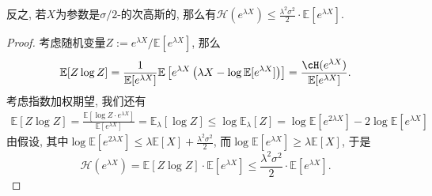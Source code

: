 \begin{remark}
	反之, 若$X$为参数是$\sigma/2$-的次高斯的, 那么有$\mathcal{H}(e^{\lambda X}) \leq \frac{\lambda^2 \sigma^2}{2} \cdot \mathbb{E}[e^{\lambda X}]$. 
	\begin{proof}
		考虑随机变量$Z := e^{\lambda X} / \mathbb{E}[e^{\lambda X}]$, 那么
		\begin{equation*}
			\mathbb{E}[Z \log Z] 
			= \frac{1}{\mathbb{E}[e^{\lambda X}]} \mathbb{E} \left[ e^{\lambda X} \left(\lambda X - \log \mathbb{E}[e^{\lambda X}] \right) \right]
			= \frac{\cH(e^{\lambda X})}{\mathbb{E}[e^{\lambda X}]}. 
		\end{equation*}
		考虑指数加权期望, 我们还有
		\begin{align*}
			\mathbb{E}[Z \log Z]
			= \frac{\mathbb{E}[\log Z \cdot e^{\lambda X}]}{\mathbb{E}[e^{\lambda X}]}
			= \mathbb{E}_{\lambda}[\log Z]
			\leq \log \mathbb{E}_{\lambda} [Z]
			= \log \mathbb{E}[e^{2\lambda X}] - 2 \log \mathbb{E}[e^{\lambda X}]
		\end{align*}
		由假设, 其中$\log \mathbb{E}[e^{2\lambda X}] \leq \lambda \mathbb{E}[X] + \frac{\lambda^2 \sigma^2}{2}$, 而$\log \mathbb{E}[e^{\lambda X}] \geq \lambda \mathbb{E}[X]$, 于是
		\begin{equation*}
			\mathcal{H}(e^{\lambda X})
			= \mathbb{E}[Z \log Z] \cdot \mathbb{E}[e^{\lambda X}]
			\leq \frac{\lambda^2 \sigma^2}{2} \cdot \mathbb{E}[e^{\lambda X}]. 
		\end{equation*}
	\end{proof}
\end{remark}

